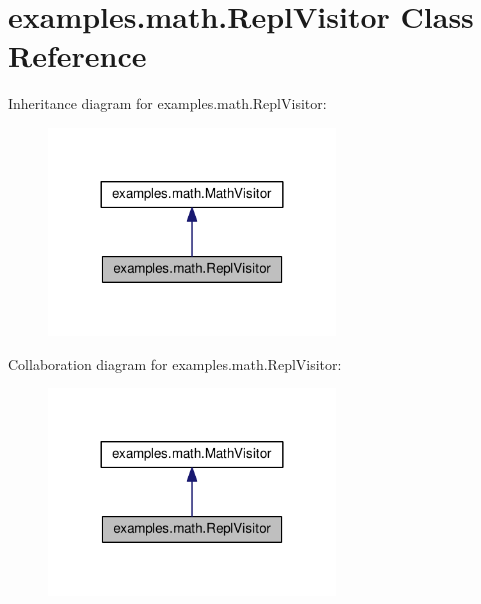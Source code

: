 \hypertarget{classexamples_1_1math_1_1_repl_visitor}{\section{examples.\-math.\-Repl\-Visitor Class Reference}
\label{classexamples_1_1math_1_1_repl_visitor}
}


Inheritance diagram for examples.\-math.\-Repl\-Visitor\-:
\nopagebreak
\begin{figure}[H]
\begin{center}
\leavevmode
\includegraphics[width=216pt]{classexamples_1_1math_1_1_repl_visitor__inherit__graph}
\end{center}
\end{figure}


Collaboration diagram for examples.\-math.\-Repl\-Visitor\-:
\nopagebreak
\begin{figure}[H]
\begin{center}
\leavevmode
\includegraphics[width=216pt]{classexamples_1_1math_1_1_repl_visitor__coll__graph}
\end{center}
\end{figure}
